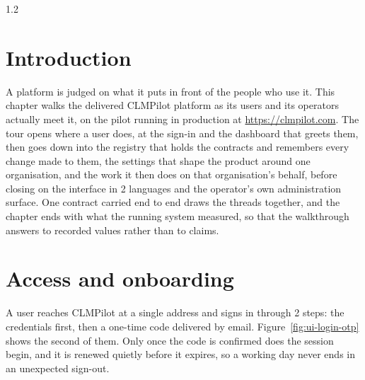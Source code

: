 \begin{spacing}{1.2}
\setlength{\intextsep}{7pt plus 2pt minus 2pt}
\setlength{\abovecaptionskip}{5pt}

\section*{Introduction}
A platform is judged on what it puts in front of the people who use it.
This chapter walks the delivered CLMPilot platform as its users and its
operators actually meet it, on the pilot running in
production at \url{https://clmpilot.com}. The tour opens where a user does, at the sign-in and the dashboard
that greets them, then goes down into the registry that holds the
contracts and remembers every change made to them, the settings that
shape the product around one organisation, and the work it then does on
that organisation's behalf, before closing on the interface in 2
languages and the operator's own administration surface. One contract
carried end to end draws the threads together, and the chapter ends
with what the running system measured, so that the walkthrough answers
to recorded values rather than to claims.

\section{Access and onboarding}
\label{sec:walk-access}

A user reaches CLMPilot at a single address and signs in through 2
steps: the credentials first, then a one-time code delivered by email.
Figure~\ref{fig:ui-login-otp} shows the second of them. Only once the
code is confirmed does the session begin, and it is renewed quietly
before it expires, so a working day never ends in an unexpected
sign-out.


\end{spacing}
